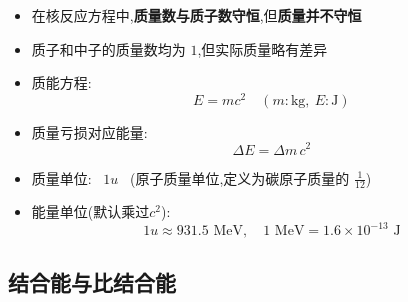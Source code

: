 \documentclass{article}
\begin{document}
\begin{itemize}
    \item 在核反应方程中,\textbf{质量数与质子数守恒},但\textbf{质量并不守恒}
    \item 质子和中子的质量数均为 $1$,但实际质量略有差异
    \item 质能方程:
          $$
              E = mc^2 \quad (m:\text{kg},\ E:\text{J})
          $$
    \item 质量亏损对应能量:
          $$
              \Delta E = \Delta m \, c^2
          $$
    \item 质量单位: \, $1u$ \, (原子质量单位,定义为碳原子质量的 $\frac{1}{12}$)
    \item 能量单位(默认乘过$c^{2}$):
          $$
              1u \approx 931.5\text{ MeV}, \quad
              1\text{ MeV} = 1.6 \times 10^{-13}\text{ J}
          $$
\end{itemize}

\subsection{结合能与比结合能}
\end{document}
